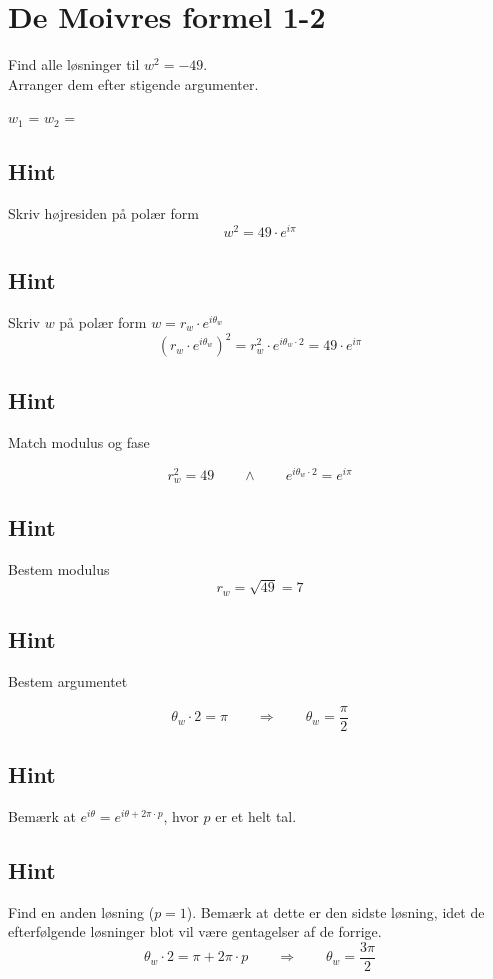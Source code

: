 \documentclass{article}
\newenvironment{exercise}[1]{\newpage\section{#1}}{}
\newcommand{\answerbox}[1]{\fbox{$#1$}}
\newcommand{\hint}{\subsection*{Hint}}
\begin{document}
\begin{exercise}{De Moivres formel 1-2}
	
	Find alle løsninger til $w^2=-49$. \\
	Arranger dem efter stigende argumenter.
	
	$w_1$ = \answerbox{7 \cdot e^{i \frac{\pi}{2}}}		$w_2$ = \answerbox{7 \cdot e^{i \frac{3 \pi}{2}}}		
	
	
	\hint 
	
	Skriv højresiden på polær form
	\[
	w^2 = 49 \cdot e^{i \pi}
	\]
	
	
	\hint
	
	Skriv $w$ på polær form $w = r_w \cdot e^{i \theta_w}$
	\[
	\left(r_w \cdot e^{i \theta_w}\right)^2 = r_w^2 \cdot e^{i \theta_w \cdot 2} = 49 \cdot e^{i \pi}
	\]
	
	\hint 
	Match modulus og fase
	
	\[
	r_w^2 = 49 \qquad \wedge \qquad e^{i \theta_w \cdot 2} = e^{i \pi}
	\]
	
	\hint
	
	Bestem modulus
	\[
	r_w  =  \sqrt{49} = 7
	\]
	
	\hint
	
	Bestem argumentet
	
	\[
	\theta_w \cdot 2 = \pi \qquad \Rightarrow \qquad  \theta_w = \frac{\pi}{2}
	\]
	
	\hint
	
	Bemærk at $e^{i \theta} = e^{i \theta + 2 \pi \cdot p}$, hvor $p$ er et helt tal.
	
	\hint
	
	Find en anden løsning ($p=1$). Bemærk at dette er den sidste løsning, idet de efterfølgende løsninger blot vil være gentagelser af de forrige. 
	\[
	\theta_w \cdot 2 = \pi  + 2 \pi \cdot p \qquad \Rightarrow \qquad  \theta_w = \frac{3 \pi}{2}
	\]

	
\end{exercise}

\newpage
\end{document}
